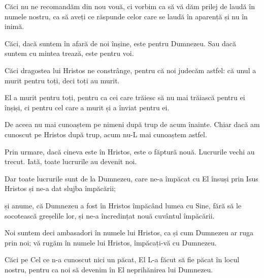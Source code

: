 {Căci nu ne recomandăm din nou vouă, ci vorbim ca să vă dăm prilej de laudă în numele nostru, ca să aveți ce răspunde celor care se laudă în aparență și nu în inimă.

Căci, dacă suntem în afară de noi înșine, este pentru Dumnezeu. Sau dacă suntem cu mintea trează, este pentru voi.

Căci dragostea lui Hristos ne constrânge, pentru că noi judecăm astfel: că unul a murit pentru toți, deci toți au murit.

El a murit pentru toți, pentru ca cei care trăiesc să nu mai trăiască pentru ei înșiși, ci pentru cel care a murit și a înviat pentru ei.


\par }{\PP {}De aceea nu mai cunoaștem pe nimeni după trup de acum înainte. Chiar dacă am cunoscut pe Hristos după trup, acum nu-L mai cunoaștem astfel.

Prin urmare, dacă cineva este în Hristos, este o făptură nouă. Lucrurile vechi au trecut. Iată, toate lucrurile au devenit noi.

Dar toate lucrurile sunt de la Dumnezeu, care ne-a împăcat cu El însuși prin Isus Hristos și ne-a dat slujba împăcării;

și anume, că Dumnezeu a fost în Hristos împăcând lumea cu Sine, fără să le socotească greșelile lor, și ne-a încredințat nouă cuvântul împăcării.


\par }{\PP {}Noi suntem deci ambasadori în numele lui Hristos, ca și cum Dumnezeu ar ruga prin noi; vă rugăm în numele lui Hristos, împăcați-vă cu Dumnezeu.

Căci pe Cel ce n-a cunoscut nici un păcat, El L-a făcut să fie păcat în locul nostru, pentru ca noi să devenim în El neprihănirea lui Dumnezeu.



\par }
